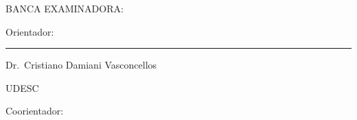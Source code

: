 

%
% 
%
\begin{folhadeaprovacao}



	\begin{center}
		{\selectfont\MakeTextUppercase{\normalsize\imprimirautor}}
	\end{center}
	\vfill

	\vfill
	\begin{center}
		{\selectfont\MakeTextUppercase{\imprimirtitulo}}
	\end{center}
	\vfill




	\vfill

	\begin{center}
		{\selectfont BANCA EXAMINADORA: }
		\vspace*{1.75cm}
	\end{center}

	{Orientador:}

	\begin{center}
		\begin{minipage}{8.75cm}
			\begin{flushleft}
				\rule{8.75cm}{0.1mm}

				Dr.\ Cristiano Damiani Vasconcellos \par
				UDESC
			\end{flushleft}
		\end{minipage}
	\end{center}

	\vspace*{\baselineskip}
	{Coorientador:}


\end{folhadeaprovacao}
